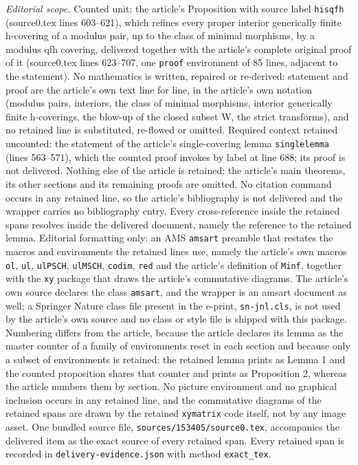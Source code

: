 \documentclass[10pt,a4paper]{amsart}
\theoremstyle{plain}
\begin{document}
\noindent\textit{Editorial scope.} Counted unit: the article's Proposition with source label \texttt{hisqfh} (source0.tex lines 603--621), which refines every proper interior generically finite h-covering of a modulus pair, up to the class of minimal morphisms, by a modulus qfh covering, delivered together with the article's complete original proof of it (source0.tex lines 623--707, one \texttt{proof} environment of 85 lines, adjacent to the statement). No mathematics is written, repaired or re-derived: statement and proof are the article's own text line for line, in the article's own notation (modulus pairs, interiors, the class of minimal morphisms, interior generically finite h-coverings, the blow-up of the closed subset W, the strict transforms), and no retained line is substituted, re-flowed or omitted. Required context retained uncounted: the statement of the article's single-covering lemma \texttt{singlelemma} (lines 563--571), which the counted proof invokes by label at line 688; its proof is not delivered. Nothing else of the article is retained: the article's main theorems, its other sections and its remaining proofs are omitted. No citation command occurs in any retained line, so the article's bibliography is not delivered and the wrapper carries no bibliography entry. Every cross-reference inside the retained spans resolves inside the delivered document, namely the reference to the retained lemma. Editorial formatting only: an AMS \texttt{amsart} preamble that restates the macros and environments the retained lines use, namely the article's own macros \texttt{ol}, \texttt{ul}, \texttt{ulPSCH}, \texttt{ulMSCH}, \texttt{codim}, \texttt{red} and the article's definition of \texttt{Minf}, together with the \texttt{xy} package that draws the article's commutative diagrams. The article's own source declares the class \texttt{amsart}, and the wrapper is an amsart document as well; a Springer Nature class file present in the e-print, \texttt{sn-jnl.cls}, is not used by the article's own source and no class or style file is shipped with this package. Numbering differs from the article, because the article declares its lemma as the master counter of a family of environments reset in each section and because only a subset of environments is retained: the retained lemma prints as Lemma 1 and the counted proposition shares that counter and prints as Proposition 2, whereas the article numbers them by section. No picture environment and no graphical inclusion occurs in any retained line, and the commutative diagrams of the retained spans are drawn by the retained \texttt{xymatrix} code itself, not by any image asset. One bundled source file, \texttt{sources/153405/source0.tex}, accompanies the delivered item as the exact source of every retained span. Every retained span is recorded in \texttt{delivery-evidence.json} with method \texttt{exact\_tex}.
\end{document}
